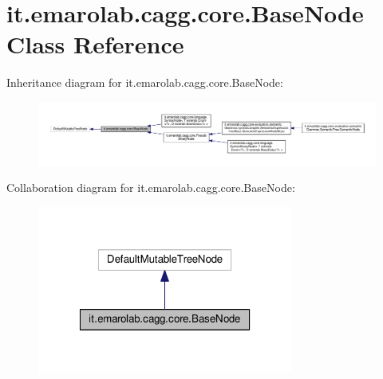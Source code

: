 \hypertarget{classit_1_1emarolab_1_1cagg_1_1core_1_1BaseNode}{\section{it.\-emarolab.\-cagg.\-core.\-Base\-Node Class Reference}
\label{classit_1_1emarolab_1_1cagg_1_1core_1_1BaseNode}
}


Inheritance diagram for it.\-emarolab.\-cagg.\-core.\-Base\-Node\-:\nopagebreak
\begin{figure}[H]
\begin{center}
\leavevmode
\includegraphics[width=350pt]{classit_1_1emarolab_1_1cagg_1_1core_1_1BaseNode__inherit__graph}
\end{center}
\end{figure}


Collaboration diagram for it.\-emarolab.\-cagg.\-core.\-Base\-Node\-:\nopagebreak
\begin{figure}[H]
\begin{center}
\leavevmode
\includegraphics[width=238pt]{classit_1_1emarolab_1_1cagg_1_1core_1_1BaseNode__coll__graph}
\end{center}
\end{figure}
